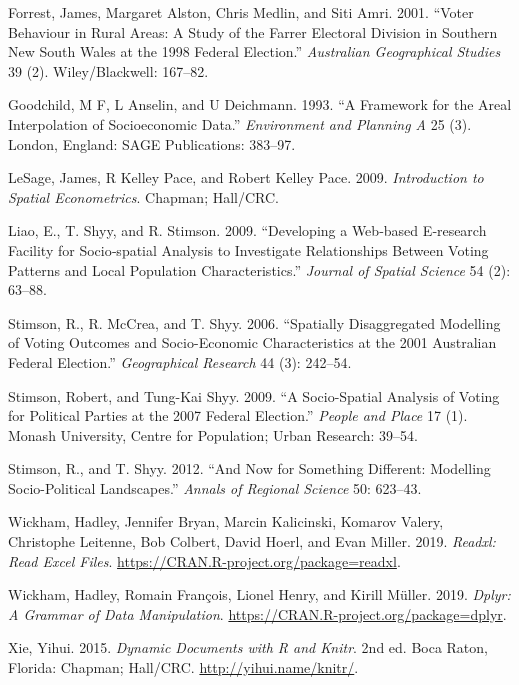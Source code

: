 \documentclass[times, doublespace]{anzsauth}
\begin{document}
\leavevmode\hypertarget{ref-Forrest01}{}%
Forrest, James, Margaret Alston, Chris Medlin, and Siti Amri. 2001. ``Voter Behaviour in Rural Areas: A Study of the Farrer Electoral Division in Southern New South Wales at the 1998 Federal Election.'' \emph{Australian Geographical Studies} 39 (2). Wiley/Blackwell: 167--82.

\leavevmode\hypertarget{ref-Goodchild1993}{}%
Goodchild, M F, L Anselin, and U Deichmann. 1993. ``A Framework for the Areal Interpolation of Socioeconomic Data.'' \emph{Environment and Planning A} 25 (3). London, England: SAGE Publications: 383--97.

\leavevmode\hypertarget{ref-LeSage2009}{}%
LeSage, James, R Kelley Pace, and Robert Kelley Pace. 2009. \emph{Introduction to Spatial Econometrics}. Chapman; Hall/CRC.

\leavevmode\hypertarget{ref-Liao09}{}%
Liao, E., T. Shyy, and R. Stimson. 2009. ``Developing a Web‐based E‐research Facility for Socio‐spatial Analysis to Investigate Relationships Between Voting Patterns and Local Population Characteristics.'' \emph{Journal of Spatial Science} 54 (2): 63--88.

\leavevmode\hypertarget{ref-Stimson06}{}%
Stimson, R., R. McCrea, and T. Shyy. 2006. ``Spatially Disaggregated Modelling of Voting Outcomes and Socio-Economic Characteristics at the 2001 Australian Federal Election.'' \emph{Geographical Research} 44 (3): 242--54.

\leavevmode\hypertarget{ref-Stimson09}{}%
Stimson, Robert, and Tung-Kai Shyy. 2009. ``A Socio-Spatial Analysis of Voting for Political Parties at the 2007 Federal Election.'' \emph{People and Place} 17 (1). Monash University, Centre for Population; Urban Research: 39--54.

\leavevmode\hypertarget{ref-Stimson12}{}%
Stimson, R., and T. Shyy. 2012. ``And Now for Something Different: Modelling Socio-Political Landscapes.'' \emph{Annals of Regional Science} 50: 623--43.

\leavevmode\hypertarget{ref-readxl}{}%
Wickham, Hadley, Jennifer Bryan, Marcin Kalicinski, Komarov Valery, Christophe Leitenne, Bob Colbert, David Hoerl, and Evan Miller. 2019. \emph{Readxl: Read Excel Files}. \url{https://CRAN.R-project.org/package=readxl}.

\leavevmode\hypertarget{ref-dplyr}{}%
Wickham, Hadley, Romain François, Lionel Henry, and Kirill Müller. 2019. \emph{Dplyr: A Grammar of Data Manipulation}. \url{https://CRAN.R-project.org/package=dplyr}.

\leavevmode\hypertarget{ref-knitr}{}%
Xie, Yihui. 2015. \emph{Dynamic Documents with R and Knitr}. 2nd ed. Boca Raton, Florida: Chapman; Hall/CRC. \url{http://yihui.name/knitr/}.
\end{document}
